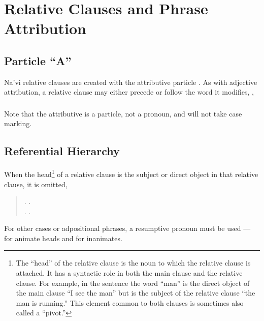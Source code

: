 \section{Relative Clauses and Phrase Attribution}
\subsection{Particle ``A''} Na'vi relative clauses are created with
the attributive particle .\label{syn:a} As
with adjective attribution, a relative clause may either precede or
follow the word it modifies,  ,
 

\subsubsection{} Note that the attributive  is a particle, not a
pronoun, and will not take case marking.

\subsection{Referential Hierarchy} When the head\footnote{The ``head''
of the relative clause is the noun to which the relative clause is
attached.  It has a syntactic role in both the main clause and the
relative clause.  For example, in the sentence  the word ``man'' is the direct object of the main clause ``I
see the man'' but is the subject of the relative clause ``the man is
running.''  This element common to both clauses is sometimes also
called a ``pivot.''} of a relative clause is the subject or direct
object in that relative clause, it is omitted,

\begin{quotation}
\noindent {}.
  .\\
\noindent {}.
  . 
\end{quotation}
\noindent For other cases or adpositional phrases, a resumptive
pronoun must be used ---  for animate heads and  for
inanimates.

